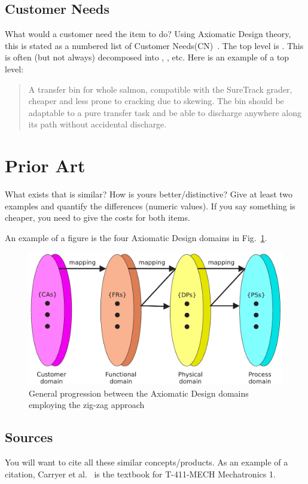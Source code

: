 \documentclass{svproc}
\begin{document}
\subsection{Customer Needs}\label{sec:customer-needs}
What would a customer need the item to do?  
Using Axiomatic Design theory, this is stated as a numbered list of Customer Needs(CN)~\cite{suh1990principles}.
The top level is .
This is often (but not always) decomposed into , , etc.
Here is an example of a top level:

\begin{quote} \textbf{} A transfer bin for whole salmon, compatible with the SureTrack grader, cheaper and less prone to cracking due to skewing.  
The bin should be adaptable to a pure transfer task and be able to discharge anywhere along its path without
accidental discharge.~\cite{gerhard2016suretrack}
\end{quote}


\section{Prior Art}\label{sec:prior-art}
What exists that is similar?  How is yours better/distinctive?
Give at least two examples and quantify the differences (numeric values).
If you say something is cheaper, you need to give the costs for both items.

An example of a figure is the four Axiomatic Design domains in Fig.~\ref{fig:ad-domains}.
\begin{figure}
  \centering
  \includegraphics[width=0.9\columnwidth]{FIG-ad-domains-zig}
  \caption{General progression between the Axiomatic Design domains employing the zig-zag approach}\label{fig:ad-domains}
\end{figure}


\subsection{Sources}\label{sec:sources}
You will want to cite all these similar concepts/products.
As an example of a citation, Carryer et al.~\cite{carryer2011IntroMechatronics} is the textbook for T-411-MECH Mechatronics 1.
\end{document}
